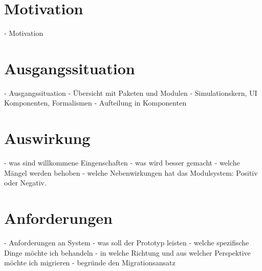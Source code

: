 
\section{Motivation}\label{sec:motivation}
	- Motivation 

\section{Ausgangssituation} \label{sec:ausgangssituation}
	- Ausgangssituation
		- Übersicht mit Paketen und Modulen 
		- Simulationskern, UI Komponenten, Formalismen   
	- Aufteilung in Komponenten 

\section{Auswirkung} \label{auswirkung}
	- was sind willkommene Eingenschaften 
	- was wird besser gemacht 
	- welche Mängel werden behoben 
	- welche Nebenwirkungen hat das Modulsystem: Positiv oder Negativ. 

\section{Anforderungen} \label{sec:anforderungen}
- Anforderungen an System 
	- was soll der Prototyp leisten 
	- welche spezifische Dinge möchte ich behandeln 
	- in welche Richtung und aus welcher Perspektive möchte ich migrieren 
	- begründe den Migrationsansatz 





